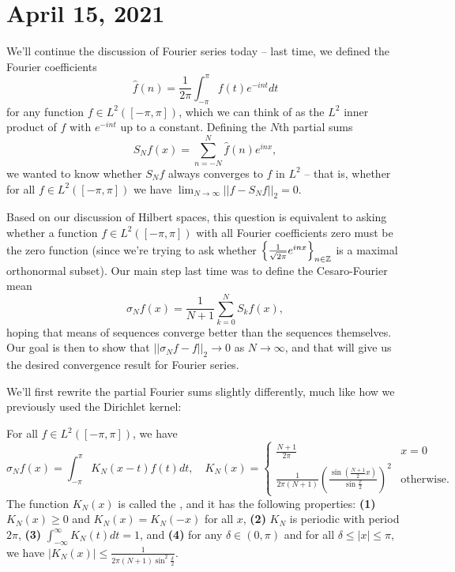 \pagebreak\section*{April 15, 2021}

We'll continue the discussion of Fourier series today -- last time, we defined the Fourier coefficients 
\[
    \hat{f}(n) = \frac{1}{2\pi} \int_{-\pi}^{\pi} f(t) e^{-int} dt
\]
for any function $f \in L^2([-\pi, \pi])$, which we can think of as the $L^2$ inner product of $f$ with $e^{-int}$ up to a constant. Defining the $N$th partial sums
\[
    S_Nf(x) = \sum_{n=-N}^N \hat{f}(n) e^{inx},
\]
we wanted to know whether $S_Nf$ always converges to $f$ in $L^2$ -- that is, whether for all $f \in L^2([-\pi, \pi])$ we have $\lim_{N \to \infty} ||f - S_N f||_2 = 0$.

Based on our discussion of Hilbert spaces, this question is equivalent to asking whether a function $f \in L^2([-\pi, \pi])$ with all Fourier coefficients zero must be the zero function (since we're trying to ask whether $\left\{\frac{1}{\sqrt{2\pi}} e^{inx}\right\}_{n \in \mathbb Z}$ is a maximal orthonormal subset). Our main step last time was to define the Cesaro-Fourier mean 
\[
    \sigma_N f(x) = \frac{1}{N+1} \sum_{k=0}^N S_k f(x),
\]
hoping that means of sequences converge better than the sequences themselves. Our goal is then to show that $||\sigma_N f - f||_2 \to 0$ as $N \to \infty$, and that will give us the desired convergence result for Fourier series.

We'll first rewrite the partial Fourier sums slightly differently, much like how we previously used the Dirichlet kernel:

\begin{proposition}
For all $f \in L^2([-\pi, \pi])$, we have 
\[
    \sigma_N f(x) = \int_{-\pi}^\pi K_N(x-t) f(t) dt, \quad K_N(x) = \begin{cases} \frac{N+1}{2\pi} & x = 0 \\ \frac{1}{2\pi(N+1)} \left(\frac{\sin\left(\frac{N+1}{2} x\right)}{\sin \frac{x}{2}}\right)^2 & \text{otherwise}. \end{cases}
\]
The function $K_N(x)$ is called the , and it has the following properties: \textbf{(1)} $K_N(x) \ge 0$ and $K_N(x) = K_N(-x)$ for all $x$, \textbf{(2)} $K_N$ is periodic with period $2\pi$, \textbf{(3)} $\int_{-\infty}^{\infty} K_N(t) dt = 1$, and \textbf{(4)} for any $\delta \in (0, \pi)$ and for all $\delta \le |x| \le \pi$, we have $|K_N(x)| \le \frac{1}{2\pi(N+1) \sin^2\frac{\delta}{2}}$.
\end{proposition}

